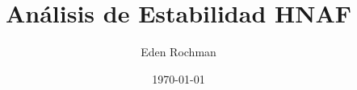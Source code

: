\documentclass[11pt]{article}
\title{Análisis de Estabilidad HNAF}
\author{Eden Rochman}
\date{\today}
\begin{document}
\maketitle
\graphicspath{{./}{./trayectorias/}}

\end{document}
